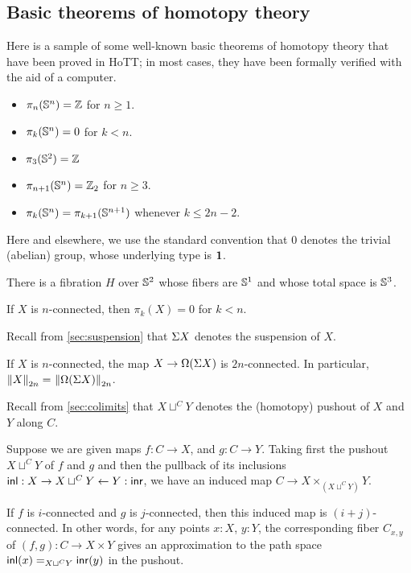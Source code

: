 \subsection{Basic theorems of homotopy theory}

Here is a sample of some well-known basic theorems of homotopy theory that have been proved in
HoTT; in most
cases, they have been formally verified with the aid of a computer.

\begin{thm}\label{homotopy-groups-of-spheres}
\mbox{}
\begin{itemize}
\item $\pi_n(\Sn ^n) = \Z$ for $n \ge 1$.
\item $\pi_k(\Sn ^n) = 0$ for $k < n$.  
\item $\pi_3(\Sn ^2) = \Z$
\item $\pi_{n+1}(\Sn ^n) = \Z_2$ for $n \ge 3$.    
\item $\pi_k(\Sn ^n) = \pi_{k+1}(\Sn ^{n+1})$ whenever $k \le 2n - 2$.  
\end{itemize}
\end{thm}

Here and elsewhere, we use the standard convention that $0$ denotes the trivial (abelian) group,
whose underlying type is $\unit$.

\begin{thm}\label{hopf-fibration}
There is a fibration $H$ over $\Sn ^2$ whose fibers are $\Sn ^1$ and
whose total space is $\Sn ^3$.  
\end{thm}

\begin{thm}\label{low-homotopy-of-connected-types}
  If $X$ is $n$-connected, then $\pi_k(X) = 0$ for $k < n$.
\end{thm}

Recall from \autoref{sec:suspension} that $\susp X$ denotes the suspension of $X$.

\begin{thm}\label{Freudenthal}
  If $X$ is $n$-connected, the map $X \rightarrow \Omega(\susp X)$ is $2n$-connected.
  In particular, $\id{\trunc{2n}{X}}{\trunc{2n}{\Omega(\susp X)}}$.
\end{thm}

Recall from \autoref{sec:colimits} that $X \sqcup^C Y$ denotes the (homotopy) pushout of $X$ and $Y$ along $C$.

\begin{thm}\label{Blakers-Massey}
  Suppose we are given maps $f : C  \rightarrow X$, and $g : C \rightarrow Y$. Taking first the pushout $X \sqcup^C Y $ of $f$ and $g$ and then the pullback of its inclusions $\inl : X \rightarrow X \sqcup^C Y \leftarrow Y : \inr$, we have an induced map $C \to X \times_{(X \sqcup^C Y)} Y$.

  If $f$ is $i$-connected and $g$ is $j$-connected, then this induced map is $(i+j)$-connected. In other words, for any points $x:X$, $y:Y$, the corresponding fiber $C_{x,y}$ of $(f,g) : C \to X \times Y $ gives an approximation to the path space $\id[X \sqcup^C Y]{\inl(x)}{\inr(y)}$ in the pushout.
\end{thm}

